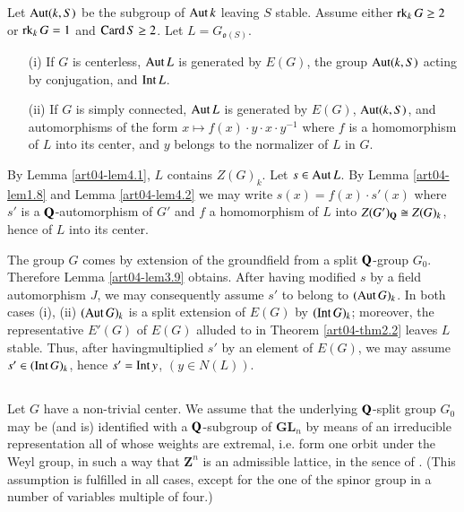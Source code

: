 \begin{theorem}\label{art04-thm4.3}
Let $\operatorname{\mathrm{Aut}} (k,S)$ be the subgroup of $\operatorname{\mathrm{Aut}} k$ leaving $S$ stable. Assume either $\operatorname{\mathrm{rk}}_{k}G\geq 2$ or $\operatorname{\mathrm{rk}}_{k}G=1$ and $\operatorname{\mathrm{Card}} S\geq 2$. Let $L=G_{\mathfrak{o}(S)}$.
\begin{itemize}
\item[{\rm(i)}] If $G$ is centerless, $\operatorname{\mathrm{Aut}} L$ is generated by $E(G)$, the group $\operatorname{\mathrm{Aut}} (k,S)$ acting by conjugation, and $\operatorname{\mathrm{Int}} L$.

\item[{\rm(ii)}] If $G$ is simply connected, $\operatorname{\mathrm{Aut}} L$ is generated by $E(G)$, $\operatorname{\mathrm{Aut}}(k,S)$, and automorphisms of the form $x\mapsto f(x)\cdot y\cdot x\cdot y^{-1}$ where $f$ is a homomorphism of $L$ into its center, and $y$ belongs to the normalizer of $L$ in $G$.
\end{itemize}
\end{theorem}

By Lemma \ref{art04-lem4.1}, $L$ contains $Z(G)_{k}$. Let $s\in \operatorname{\mathrm{Aut}} L$. By Lemma \ref{art04-lem1.8} and Lemma \ref{art04-lem4.2} we may write $s(x)=f(x)\cdot s'(x)$ where $s'$ is a $\mathbf{Q}$-automorphism of $G'$ and $f$ a homomorphism of $L$ into $Z(G')_{\mathbf{Q}}\cong Z(G)_{k}$, hence of $L$ into its center.

The group $G$ comes by extension of the groundfield from a split $\mathbf{Q}$-group $G_{0}$. Therefore Lemma \ref{art04-lem3.9} obtains. After having modified $s$ by a field automorphism $J$, we may consequently assume $s'$ to belong to $(\operatorname{\mathrm{Aut}} G)_{k}$. In both cases (i), (ii) $(\operatorname{\mathrm{Aut}} G)_{k}$ is a split extension of $E(G)$ by $(\operatorname{\mathrm{Int}} G)_{k}$; moreover, the representative $E'(G)$ of $E(G)$ alluded to in Theorem \ref{art04-thm2.2} leaves $L$ stable. Thus, after having\pageoriginale multiplied $s'$ by an element of $E(G)$, we may assume $s'\in (\operatorname{\mathrm{Int}} G)_{k}$, hence $s'=\operatorname{\mathrm{Int}} y$, $(y\in N(L))$.

\setcounter{subsection}{3}
\subsection{}\label{art04-sec4.4}

Let $G$ have a non-trivial center. We assume that the underlying $\mathbf{Q}$-split group $G_{0}$ may be (and is) identified with a $\mathbf{Q}$-subgroup of $\mathbf{GL}_{n}$ by means of an irreducible representation all of whose weights are extremal, i.e. form one orbit under the Weyl group, in such a way that $\mathbf{Z}^{n}$ is an admissible lattice, in the sence of \cite{art04-key10}. (This assumption is fulfilled in all cases, except for the one of the spinor group in a number of variables multiple of four.)


